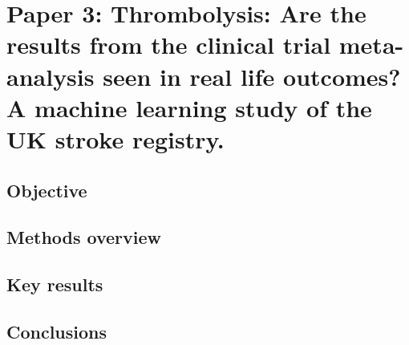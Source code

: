 \section{Paper 3: Thrombolysis: Are the results from the clinical trial meta-analysis seen in real life outcomes?  A machine learning study of the UK stroke registry.\cite{pearn_are_2024}}\label{sec:paper_3}

\subsection{Objective}

\subsection{Methods overview}

\subsection{Key results}

\subsection{Conclusions}
